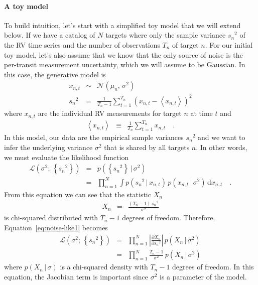 \documentclass[modern, letterpaper]{aastex63}
\newcommand{\dd}{\ensuremath{\,\mathrm{d}}}
\begin{document}
\paragraph{A toy model}

To build intuition, let's start with a simplified toy model that we will extend below.
If we have a catalog of $N$ targets where only the sample variance ${s_n}^2$ of the RV time series and the number of observations $T_n$ of target $n$.
For our initial toy model, let's also assume that we know that the only source of noise is the per-transit measurement uncertainty, which we will assume to be Gaussian.
In this case, the generative model is
\begin{eqnarray}
  x_{n,t} &\sim& \mathcal{N}(\mu_n,\,\sigma^2) \\
  {s_n}^2 &=& \frac{1}{T_n - 1}\sum_{t=1}^{T_n} \left(x_{n,t} - \left< x_{n,t} \right>\right)^2
\end{eqnarray}
where $x_{n,t}$ are the individual RV measurements for target $n$ at time $t$ and
\begin{eqnarray}
  \left< x_{n,t} \right> &\equiv& \frac{1}{T_n}\sum_{t=1}^{T_n}x_{n,t} \quad.
\end{eqnarray}
In this model, our data are the empirical sample variances ${s_n}^2$ and we want to infer the underlying variance $\sigma^2$ that is shared by all targets $n$.
In other words, we must evaluate the likelihood function
\begin{eqnarray}
  \label{eq:noise-like1}
  \mathcal{L}(\sigma^2;\,\left\{{s_n}^2\right\}) &=& p(\left\{{s_n}^2\right\}\,|\,\sigma^2) \\
  &=& \prod_{n=1}^N\int p({s_n}^2\,|\,x_{n,t})\,p(x_{n,t}\,|\,\sigma^2) \dd x_{n,t}\quad.
\end{eqnarray}
From this equation we can see that the statistic $X_n$
\begin{eqnarray}
  X_n &=& \frac{(T_n - 1)\,{s_n}^2}{\sigma^2}
\end{eqnarray}
is chi-squared distributed with $T_n - 1$ degrees of freedom.
Therefore, Equation~\ref{eq:noise-like1} becomes
\begin{eqnarray}
  \label{eq:noise-like2}
  \mathcal{L}(\sigma^2;\,\left\{{s_n}^2\right\}) &=& \prod_{n=1}^N \left|\frac{\partial X_n}{\partial {s_n}^2}\right|\,p(X_n\,|\,\sigma^2) \nonumber\\
  &=& \prod_{n=1}^N \frac{T_n - 1}{\sigma^2}\,p(X_n\,|\,\sigma^2)
\end{eqnarray}
where $p(X_n\,|\,\sigma)$ is a chi-squared density with $T_n - 1$ degrees of freedom.
In this equation, the Jacobian term is important since $\sigma^2$ is a parameter of the model.
\end{document}
